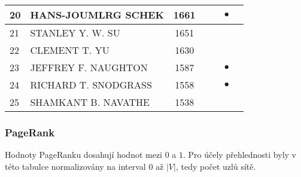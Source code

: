\documentclass[12pt,titlepage]{report}
\begin{document}
\begin{center}
\begin{tabular}{|l|l|c|c|c|c|c|}
\hline
20 & HANS-JOUMLRG SCHEK & 1661  &&         &$\bullet$&         \\
\hline
21 & STANLEY Y. W. SU & 1651    &&         &         &         \\
\hline
22 & CLEMENT T. YU & 1630       &&         &         &         \\
\hline
23 & JEFFREY F. NAUGHTON & 1587 &&         &$\bullet$&         \\
\hline
24 & RICHARD T. SNODGRASS & 1558&&         &$\bullet$&         \\
\hline
25 & SHAMKANT B. NAVATHE & 1538 &&         &         &         \\
\hline
\end{tabular}
\end{center}


\subsubsection{PageRank}
Hodnoty PageRanku dosahují hodnot mezi $0$ a $1$. Pro účely přehlednosti byly v
této tabulce normalizovány na interval $0$ až $|V|$, tedy počet uzlů sítě.
\end{document}
